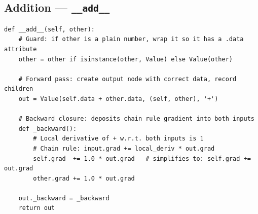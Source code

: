\documentclass[12pt,a4paper]{article}
\begin{document}
\subsection{Addition — \texttt{\_\_add\_\_}}

\begin{lstlisting}
def __add__(self, other):
    # Guard: if other is a plain number, wrap it so it has a .data attribute
    other = other if isinstance(other, Value) else Value(other)

    # Forward pass: create output node with correct data, record children
    out = Value(self.data + other.data, (self, other), '+')

    # Backward closure: deposits chain rule gradient into both inputs
    def _backward():
        # Local derivative of + w.r.t. both inputs is 1
        # Chain rule: input.grad += local_deriv * out.grad
        self.grad  += 1.0 * out.grad   # simplifies to: self.grad += out.grad
        other.grad += 1.0 * out.grad

    out._backward = _backward
    return out
\end{lstlisting}
\end{document}
